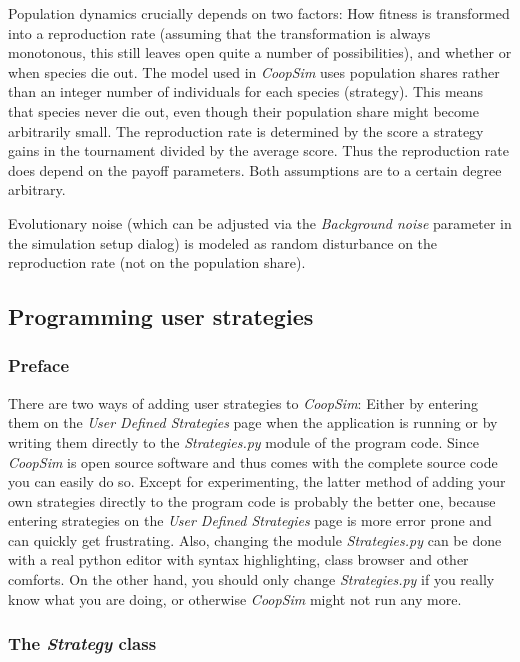 \documentclass[12pt,a4paper,USenglish]{article}
\begin{document}
Population dynamics crucially depends on two factors: How fitness
is transformed into a reproduction rate (assuming that the transformation
is always monotonous, this still leaves open quite a number of possibilities),
and whether or when species die out. The model used in \emph{CoopSim}
uses population shares rather than an integer number of individuals
for each species (strategy). This means that species never die out,
even though their population share might become arbitrarily small.
The reproduction rate is determined by the score a strategy gains
in the tournament divided by the average score. Thus the reproduction
rate does depend on the payoff parameters. Both assumptions
are to a certain degree arbitrary.

Evolutionary noise (which can be adjusted via the \emph{Background
noise} parameter in the simulation setup dialog) is modeled as random
disturbance on the reproduction rate (not on the population share).



\subsection{Programming user strategies}


\subsubsection{Preface}

There are two ways of adding user strategies to \emph{CoopSim}: Either by
entering them on the \emph{User Defined Strategies} page when the application
is running or by writing them directly to the \emph{Strategies.py} module of
the program code. Since \emph{CoopSim} is open source software and thus comes
with the complete source code you can easily do so. Except for experimenting,
the latter method of adding your own strategies directly to the program code
is probably the better one, because entering strategies on the \emph{User
Defined Strategies} page is more error prone and can quickly get frustrating.
Also, changing the module \emph{Strategies.py} can be done with a real python
editor with syntax highlighting, class browser and other comforts. On the
other hand, you should only change \emph{Strategies.py} if you really know
what you are doing, or otherwise \emph{CoopSim} might not run any more.


\subsubsection{The \emph{Strategy} class}
\end{document}
